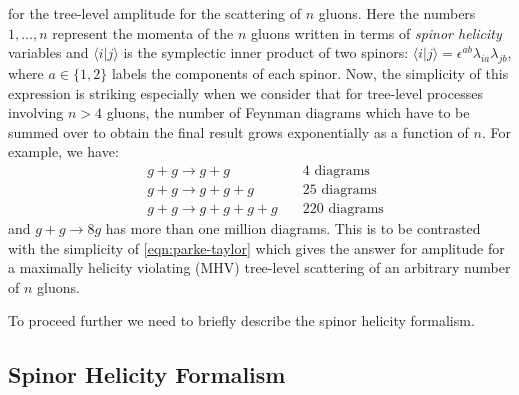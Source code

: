 \documentclass[twocolumn,final,aps,nofootinbib,nobibnotes]{revtex4-2}
\newcommand{\innerp}[2]{\langle #1 \vert #2 \rangle}
\begin{document}
for the tree-level amplitude for the scattering of $ n $ gluons. Here the numbers $ 1, \ldots, n $ represent the momenta of the $ n $ gluons written in terms of \emph{spinor helicity} variables and $ \innerp{i}{j} $ is the symplectic inner product of two spinors: $ \innerp{i}{j} = \epsilon^{ab}\lambda_{ia} \lambda_{jb} $, where $ a \in \{1,2\} $ labels the components of each spinor. Now, the simplicity of this expression is striking especially when we consider that for tree-level processes involving $ n > 4 $ gluons, the number of Feynman diagrams which have to be summed over to obtain the final result grows exponentially as a function of $ n $.  For example, we have:
\begin{align*}
    &g+g \longrightarrow g+g \quad &\text{4 diagrams} \\
    &g+g \longrightarrow g+g+g \quad &\text{25 diagrams} \\
    &g+g \longrightarrow g+g+g+g \quad &\text{220 diagrams} 
\end{align*}
and $g+g \longrightarrow 8g$ has more than one million diagrams. This is to be contrasted with the simplicity of \eqref{eqn:parke-taylor} which gives the answer for amplitude for a maximally helicity violating (MHV) tree-level scattering of an arbitrary number of $ n $ gluons.

To proceed further we need to briefly describe the spinor helicity formalism.

\subsection{Spinor Helicity Formalism}\label{sec:spinor-helicity}
\end{document}
